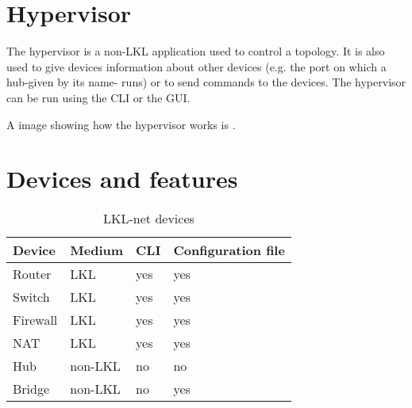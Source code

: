 \section{Hypervisor}
\label{sub-sec:hypervisor}
The hypervisor is a non-LKL application used to control a topology. It is also used to give devices information 
about other devices (e.g. the port on which a hub-given by its name- runs) or to send commands to the devices. 
The hypervisor can be run using the CLI or the GUI.

A image showing how the hypervisor works is . 

\section{Devices and features}
\begin{center}
  \begin{table}[htb]
  \begin{center}
  \begin{tabular}{ | l | l | l | l |}
    \hline
      Device & Medium & CLI & Configuration file\\ \hline
      Router & LKL & yes & yes\\ \hline
      Switch & LKL & yes & yes\\ \hline
      Firewall & LKL & yes & yes\\ \hline
      NAT & LKL & yes & yes\\ \hline
      Hub & non-LKL & no & no\\ \hline
      Bridge & non-LKL & no & yes\\ 
    \hline
  \end{tabular}
  \end{center}
  \caption{LKL-net devices}
  \label{table:tdevices}
  \end{table}
\end{center}
